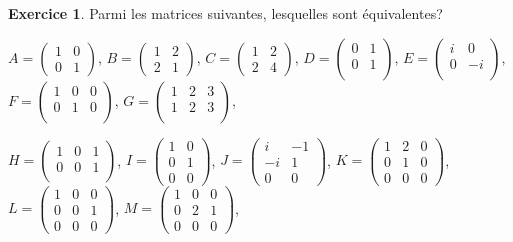 \documentclass[11pt,a4paper]{article}
\theoremstyle{definition}
\newtheorem{exo}{Exercice}
\begin{document}
\begin{exo}
Parmi les matrices suivantes, lesquelles sont équivalentes?

$
A = \begin{pmatrix}
1 & 0 \\
0 & 1
\end{pmatrix}
$,
$B = \begin{pmatrix}
1 & 2 \\
2 & 1
\end{pmatrix}$,
$C = \begin{pmatrix}
1 & 2 \\
2 & 4
\end{pmatrix}$,
$D =  \begin{pmatrix}
0 & 1 \\
0 & 1  \\
\end{pmatrix}$,
$E= \begin{pmatrix}
i & 0 \\
0 & -i  \\
\end{pmatrix}$,
$
F =  \begin{pmatrix}
1 & 0 & 0 \\
0 & 1 & 0 \\
\end{pmatrix}$,
$G =  \begin{pmatrix}
1 & 2 & 3\\
1 & 2 & 3 \\
\end{pmatrix}$, \smallskip

\noindent
$H =  \begin{pmatrix}
1 & 0 &  1\\
0 & 0 & 1 \\
\end{pmatrix}$,
$I =  \begin{pmatrix}
1 & 0 \\
0 & 1 \\
0 & 0
\end{pmatrix}$,
$J =  \begin{pmatrix}
i & -1 \\
-i & 1 \\
0 & 0
\end{pmatrix}$,
$K = \begin{pmatrix}
1 & 2 & 0 \\
0 & 1 & 0 \\
0 & 0 & 0
\end{pmatrix}$,
$L =  \begin{pmatrix}
1 & 0 & 0 \\
0 & 0 & 1 \\
0 & 0 & 0
\end{pmatrix}$,
$M =  \begin{pmatrix}
1 & 0 & 0 \\
0 & 2 & 1 \\
0 & 0 & 0
\end{pmatrix}$,\smallskip


\end{exo}
\end{document}
